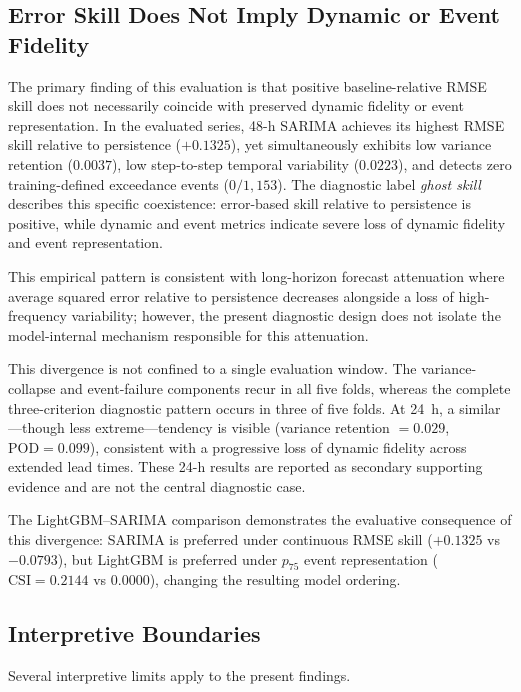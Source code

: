 \documentclass[12pt]{article}
\begin{document}
\subsection{Error Skill Does Not Imply Dynamic or Event Fidelity}
\label{sec:disc_main}

The primary finding of this evaluation is that positive baseline-relative
RMSE skill does not necessarily coincide with preserved dynamic fidelity
or event representation. In the evaluated series, 48-h SARIMA achieves
its highest RMSE skill relative to persistence ($+0.1325$), yet
simultaneously exhibits low variance retention ($0.0037$), low step-to-step
temporal variability ($0.0223$), and detects zero training-defined
exceedance events ($0/1,153$). The diagnostic label \emph{ghost skill}
describes this specific coexistence: error-based skill relative to
persistence is positive, while dynamic and event metrics indicate severe
loss of dynamic fidelity and event representation.

This empirical pattern is consistent with long-horizon forecast attenuation
where average squared error relative to persistence decreases alongside
a loss of high-frequency variability; however, the present diagnostic
design does not isolate the model-internal mechanism responsible for
this attenuation.

This divergence is not confined to a single evaluation window.
The variance-collapse and event-failure components recur in all five
folds, whereas the complete three-criterion diagnostic pattern occurs
in three of five folds. At 24~h, a similar---though less extreme---tendency
is visible (variance retention $= 0.029$, $\mathrm{POD} = 0.099$),
consistent with a progressive loss of dynamic fidelity across extended
lead times. These 24-h results are reported as secondary supporting
evidence and are not the central diagnostic case.

The LightGBM--SARIMA comparison demonstrates the evaluative consequence
of this divergence: SARIMA is preferred under continuous RMSE skill
($+0.1325$ vs $-0.0793$), but LightGBM is preferred under $p_{75}$
event representation ($\mathrm{CSI} = 0.2144$ vs $0.0000$), changing
the resulting model ordering.

\subsection{Interpretive Boundaries}
\label{sec:disc_boundaries}

Several interpretive limits apply to the present findings.
\end{document}
